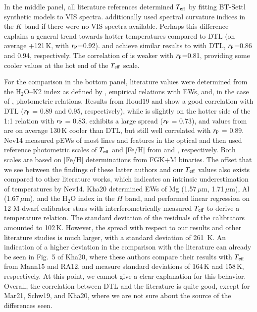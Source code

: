 \documentclass{aa}
\begin{document}
In the middle panel, all literature references determined $T_{\rm eff}$ by fitting BT-Settl synthetic models \citep{Allard2011} to VIS spectra. \citet[][GM14]{GaidosMann2014} additionally used spectral curvature indices in the $K$ band if there were no VIS spectra available. {Perhaps} this difference explains a general trend towards hotter temperatures compared to DTL (on average +121\,K, with $r_{\rm P}$=0.92). \citet[][Gaid14]{Gaidos2014} and \citet[][Mann15]{Mann2015} achieve similar results to with DTL, $r_{\rm P}$=0.86 and 0.94, respectively. The correlation of \citet[][Lep13]{Lepine2013} is weaker with $r_{\rm P}$=0.81, providing some cooler values at the hot end of the $T_{\rm eff}$ scale. 

For the comparison in the bottom panel, literature values were determined from the H$_{2}$O--K2 index as defined by \citet{RojasAyala2012}, empirical relations with EWs, and, in the case of \citet[][Houd19]{Houdebine2019}, photometric relations. Results from Houd19 and \citet[][New15]{Newton2015} show a good correlation with DTL ($r_{\rm P}$ = 0.89 and 0.95, respectively), while \citet[][RA12]{RojasAyala2012} is slightly on the hotter side of the 1:1 relation with $r_{\rm P}$ = 0.83. \citet[][Kha20]{Khata2020} exhibits a large spread ($r_{\rm P}$ = 0.73), and values from \citet[][Nev14]{Neves2014} are on average 130\,K cooler than DTL, but still well correlated with $r_{\rm P}$ = 0.89. Nev14 measured pEWs of most lines and features in the optical and then used reference photometric scales of $T_{\rm eff}$ and [Fe/H] from \cite{Casagrande2008} and \cite{Neves2012}, respectively. Both scales are based on [Fe/H] determinations from FGK+M binaries. The offset that we see between the findings of these latter authors and our $T_{\rm eff}$ values also exists compared to other literature works, which indicates an intrinsic underestimation of temperatures by Nev14. Kha20 determined EWs of Mg (1.57\,$\mu$m, 1.71\,$\mu$m), Al (1.67\,$\mu$m), and the H$_{2}$O index in the $H$ band, and performed linear regression on 12 M-dwarf calibrator stars with interferometrically measured $T_{\rm eff}$ to derive a temperature relation. The standard deviation of the residuals of the calibrators amounted to 102\,K. However, the spread with respect to our results and other literature studies is much larger, with a standard deviation of 261 \,K. An indication of a higher deviation in the comparison with the literature can already be seen in Fig.~5 of Kha20, where these authors compare their results with $T_{\rm eff}$ from Mann15 and RA12, and measure standard deviations of 164\,K and 158\,K, respectively. At this point, we cannot give a clear explanation for this behavior.
Overall, the correlation between DTL and the literature is quite good, except for Mar21, Schw19, and Kha20, where we are not sure about the source of the differences seen.
\end{document}
